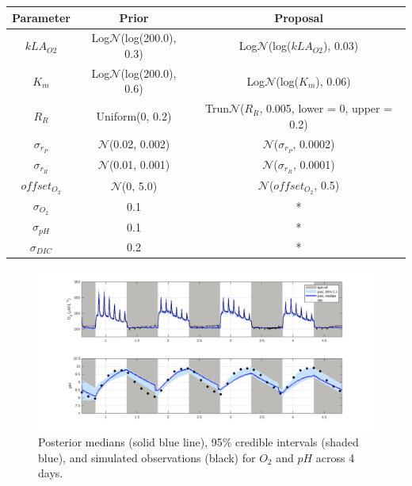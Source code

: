 \documentclass{ruthesis}
\begin{document}
\FloatBarrier
\begin{tabular}{c | c  |  c}
	\hline
	\bfseries{Parameter} & \bfseries{Prior} &  \bfseries{Proposal} \\ \hline
	$kLA_{O2}$  & Log$\mathcal{N}$(log(200.0), 0.3)  & Log$\mathcal{N}$(log($kLA_{O2}$), 0.03) \\
	$K_m$ 		&  Log$\mathcal{N}$(log(200.0), 0.6) & Log$\mathcal{N}$(log($K_m$), 0.06) \\
	$R_R$  		& Uniform(0, 0.2) &  Trun$\mathcal{N}$($R_R$, 0.005, lower = 0, upper = 0.2) \\
	$\sigma_{r_P}$ & $\mathcal{N}$(0.02, 0.002)   & $\mathcal{N}$($\sigma_{r_P}$, 0.0002)   \\
	$\sigma_{r_R}$ & $\mathcal{N}$(0.01, 0.001)   & $\mathcal{N}$($\sigma_{r_R}$, 0.0001)   \\
	$offset_{O_2}$ & $\mathcal{N}$(0, 5.0)     & $\mathcal{N}$($offset_{O_2}$, 0.5)   \\
	$\sigma_{O_2}$ 	& 0.1 	& * \\
	$\sigma_{pH}$ 	& 0.1 	& * \\
	$\sigma_{DIC}$ 	& 0.2 	& * \\	
\end{tabular}

\FloatBarrier



\begin{figure}
	\centerline{\includegraphics[width=1.2\textwidth]{images_microalgae/plots_chris_offset/O2_pH}}
	\caption[.]{Posterior medians (solid blue line), 95\% credible intervals (shaded blue), and simulated observations (black) for $O_2$ and $pH$ across 4 days.}
	\label{fig:micro_exp_offset_O2_pH}
\end{figure}
\end{document}
